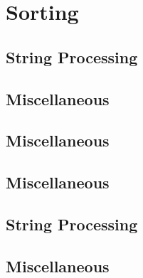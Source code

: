 \section{Sorting}
\subsection{String Processing}
\raggedbottom
\vspace{-.7\baselineskip}\hrulefill
\vspace{0.1\baselineskip}\subsection{Miscellaneous}
\raggedbottom
\vspace{-.7\baselineskip}\hrulefill
\vspace{0.1\baselineskip}\subsection{Miscellaneous}
\raggedbottom
\vspace{-.7\baselineskip}\hrulefill
\vspace{0.1\baselineskip}\subsection{Miscellaneous}
\raggedbottom
\vspace{-.7\baselineskip}\hrulefill
\vspace{0.1\baselineskip}\subsection{String Processing}
\raggedbottom
\vspace{-.7\baselineskip}\hrulefill
\vspace{0.1\baselineskip}\subsection{Miscellaneous}
\raggedbottom
